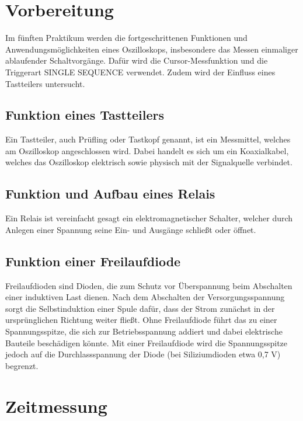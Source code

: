 \documentclass{article}
\begin{document}
\newpage
\thispagestyle{empty}

\tableofcontents


\newpage

\section{Vorbereitung}
Im fünften Praktikum werden die fortgeschrittenen Funktionen und Anwendungsmöglichkeiten eines Oszilloskops, insbesondere das Messen einmaliger ablaufender Schaltvorgänge.
Dafür wird die Cursor-Messfunktion und die Triggerart SINGLE SEQUENCE verwendet.
Zudem wird der Einfluss eines Tastteilers untersucht.
 
\subsection{Funktion eines Tastteilers}
Ein Tastteiler, auch Prüfling oder Tastkopf genannt, ist ein Messmittel, welches am Oszilloskop angeschlossen wird. Dabei handelt es sich um ein Koaxialkabel, welches das Oszilloskop elektrisch sowie physisch mit der Signalquelle verbindet.
 
\subsection{Funktion und Aufbau eines Relais}
Ein Relais ist vereinfacht gesagt ein elektromagnetischer Schalter, welcher durch Anlegen einer Spannung seine Ein- und Ausgänge schließt oder öffnet.
 
\subsection{Funktion einer Freilaufdiode}
Freilaufdioden sind Dioden, die zum Schutz vor Überspannung beim Abschalten einer induktiven Last dienen.
Nach dem Abschalten der Versorgungsspannung sorgt die Selbstinduktion einer Spule dafür, dass der Strom zunächst in der ursprünglichen Richtung weiter fließt. 
Ohne Freilaufdiode führt das zu einer Spannungsspitze, die sich zur Betriebsspannung addiert und dabei elektrische Bauteile beschädigen könnte.
Mit einer Freilaufdiode wird die Spannungsspitze jedoch auf die Durchlassspannung der Diode (bei Siliziumdioden etwa 0,7 V) begrenzt. 
\newpage

\section{Zeitmessung}
\end{document}
